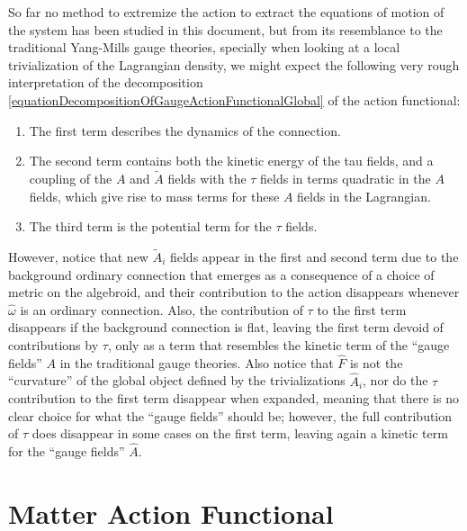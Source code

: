 So far no method to extremize the action to extract the equations of motion of the system has been studied in this document, but from its resemblance to the traditional Yang-Mills gauge theories, specially when looking at a local trivialization of the Lagrangian density, we might expect the following very rough interpretation of the decomposition \eqref{equationDecompositionOfGaugeActionFunctionalGlobal} of the action functional:
\begin{enumerate}
    \item The first term describes the dynamics of the connection. 
    
    \item The second term contains both the kinetic energy of the tau fields, and a coupling of the $A$ and $\tilde A$ fields with the $\tau$ fields in terms quadratic in the $A$ fields, which give rise to mass terms for these $A$ fields in the Lagrangian.
    
    \item The third term is the potential term for the $\tau$ fields.
\end{enumerate}
However, notice that new $\tilde A_i$ fields appear in the first and second term due to the background ordinary connection that emerges as a consequence of a choice of metric on the algebroid, and their contribution to the action disappears whenever $\hat \omega$ is an ordinary connection. Also, the contribution of $\tau$ to the first term disappears if the background connection is flat, leaving the first term devoid of contributions by $\tau$, only as a term that resembles the kinetic term of the ``gauge fields'' $A$ in the traditional gauge theories. Also notice that $\hat F$ is not the ``curvature'' of the global object defined by the trivializations $\hat A_i$, nor do the $\tau$ contribution to the first term disappear when expanded, meaning that there is no clear choice for what the ``gauge fields'' should be; however, the full contribution of $\tau$ does disappear in some cases on the first term, leaving again a kinetic term for the ``gauge fields'' $\hat A$.

\section{Matter Action Functional}
\label{chGaugeSectionMatterAction}

